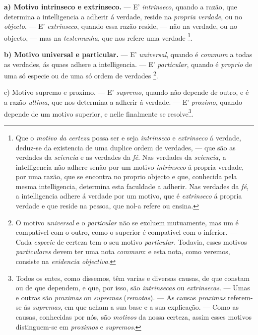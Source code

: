 \textbf{a) Motivo intrinseco e extrinseco.} --- E' \emph{intrinseco}, quando a razão, que determina a intelligencia a adherir á verdade, reside na \emph{propria verdade}, ou no \emph{objecto}. --- E' \emph{extrinseco}, quando essa razão reside, --- não na verdade, ou no objecto, --- mas na \emph{testemunha}, que nos refere uma verdade \footnote{Que o \emph{motivo da certeza} possa ser e seja \emph{intrinseco} e \emph{extrinseco} á verdade, deduz-se da existencia de uma duplice ordem de verdades, --- que são as verdades da \emph{sciencia} e as verdades da \emph{fé}. Nas verdades da \emph{sciencia}, a intelligencia não adhere senão por um motivo \emph{intrinseco} á propria verdade, por uma razão, que se encontra no proprio objecto e que, conhecida pela mesma intelligencia, determina esta faculdade a adherir. Nas verdades da \emph{fé}, a intelligencia adhere á verdade por um motivo, que é \emph{extrinseco} á propria verdade e que reside na pessoa, que nol-a refere ou ensina.}.

\textbf{b) Motivo universal e particular.} --- E' \emph{universal}, quando é \emph{commum} a todas as verdades, ás quaes adhere a intelligencia. --- E' \emph{particular}, quando é \emph{proprio} de uma só especie ou de uma só ordem de verdades \footnote{O motivo \emph{universal} e o \emph{particular} não se excluem mutuamente, mas um é compativel com o outro, como o superior é compativel com o inferior. --- Cada \emph{especie} de certeza tem o seu motivo \emph{particular}. Todavia, esses motivos \emph{particulares} devem ter uma nota \emph{commum}: e esta nota, como veremos, consiste na \emph{evidencia objectiva}.}.

c) Motivo supremo e proximo. --- E' \emph{supremo}, quando não depende de outro, e é a razão \emph{ultima}, que nos determina a adherir á verdade. --- E' \emph{proximo}, quando depende de um motivo superior, e nelle finalmente se resolve\footnote{Todos os entes, como dissemos, têm varias e diversas causas, de que constam ou de que dependem, e que, por isso, são \emph{intrinsecas} ou \emph{extrinsecas}. --- Umas e outras são \emph{proximas} ou \emph{supremas} (\emph{remotas}). --- As causas \emph{proximas} referem-se ás \emph{supremas}, em que acham a sua base e a sua explicação. --- Como as causas, conhecidas por nós, são \emph{motivos} da nossa certeza, assim esses motivos distinguem-se em \emph{proximos} e \emph{supremos}.}.



